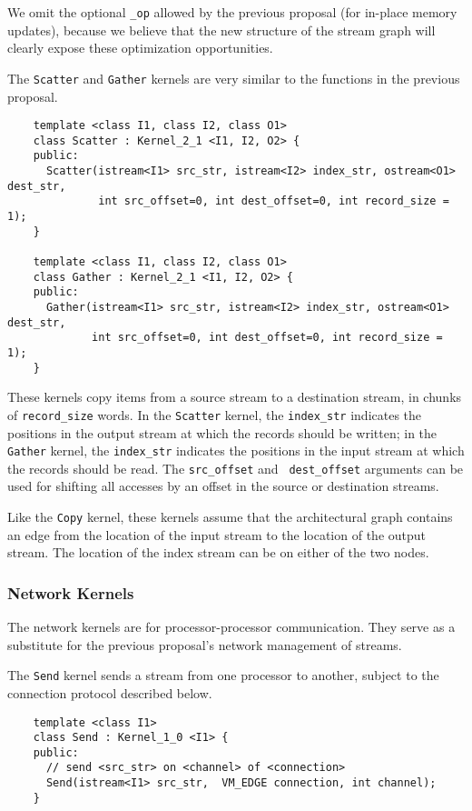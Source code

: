 We omit the optional {\tt \_op} allowed by the previous proposal (for
in-place memory updates), because we believe that the new structure of
the stream graph will clearly expose these optimization opportunities.

 The {\tt Scatter} and {\tt Gather} kernels are
very similar to the functions in the previous proposal.
{\small
\begin{verbatim}
    template <class I1, class I2, class O1>
    class Scatter : Kernel_2_1 <I1, I2, O2> {
    public:
      Scatter(istream<I1> src_str, istream<I2> index_str, ostream<O1> dest_str, 
              int src_offset=0, int dest_offset=0, int record_size = 1);
    }

    template <class I1, class I2, class O1>
    class Gather : Kernel_2_1 <I1, I2, O2> {
    public:
      Gather(istream<I1> src_str, istream<I2> index_str, ostream<O1> dest_str, 
             int src_offset=0, int dest_offset=0, int record_size = 1);
    }  
\end{verbatim}}

These kernels copy items from a source stream to a destination stream,
in chunks of {\tt record\_size} words.  In the {\tt Scatter} kernel,
the {\tt index\_str} indicates the positions in the output stream at
which the records should be written; in the {\tt Gather} kernel, the
{\tt index\_str} indicates the positions in the input stream at which
the records should be read.  The {\tt src\_offset} and {\tt
dest\_offset} arguments can be used for shifting all accesses by an
offset in the source or destination streams.

Like the {\tt Copy} kernel, these kernels assume that the
architectural graph contains an edge from the location of the input
stream to the location of the output stream.  The location of the
index stream can be on either of the two nodes.

\subsubsection*{Network Kernels}

The network kernels are for processor-processor communication.  They
serve as a substitute for the previous proposal's network management
of streams.

 The {\tt Send} kernel sends a stream from one processor to
another, subject to the connection protocol described below.
{\small
\begin{verbatim}
    template <class I1>
    class Send : Kernel_1_0 <I1> {
    public:
      // send <src_str> on <channel> of <connection>
      Send(istream<I1> src_str,  VM_EDGE connection, int channel);
    }
\end{verbatim}}

